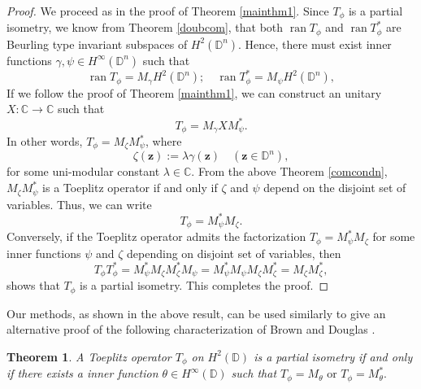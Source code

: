 \documentclass[12pt]{amsart}
\newtheorem{thm}[propn]{Theorem}
\theoremstyle{definition}
\newcommand{\D}{\mathbb{D}}
\DeclareMathOperator{\ran}{ran}
\newcommand{\1}{{\mbox{\bf 1}}}
\newcommand{\raro}{\rightarrow}
\begin{document}
\begin{proof}
We proceed as in the proof of Theorem \ref{mainthm1}. Since $T_{\phi}$ is a partial isometry, we know from Theorem \ref{doubcom}, that both $\ran T_{\phi}$ and $\ran T_{\phi}^*$ are Beurling type invariant subspaces of $H^2(\D^n)$. Hence, there must exist inner functions $\gamma, \psi \in H^{\infty}(\D^n)$ such that 
\[
\ran T_{\phi} =M_{\gamma} H^2(\D^n); \quad \ran T_{\phi}^* = M_{\psi} H^2(\D^n),
\]
If we follow the proof of Theorem \ref{mainthm1}, we can construct an unitary $X: \mathbb{C} \raro \mathbb{C}$ such that 
\[
T_{\phi} = M_{\gamma} X M_{\psi}^*.
\]
In other words, $T_{\phi} = M_{\zeta} M_{\psi}^*$, where 
\[
\zeta(\bm{z}):= \lambda \gamma(\bm{z}) \quad (\bm{z} \in \D^n),
\]
for some uni-modular constant $\lambda \in \mathbb{C}$.  From the above Theorem \ref{comcondn}, $M_{\zeta} M_{\psi}^*$ is a Toeplitz operator if and only if $\zeta$ and $\psi$ depend on the disjoint set of variables. Thus, we can write
\[
T_{\phi} = M_{\psi}^* M_{\zeta}.
\]
Conversely, if the Toeplitz operator admits the factorization $T_{\phi} = M_{\psi}^* M_{\zeta}$ for some inner functions $\psi$ and $\zeta$ depending on disjoint set of variables, then
\[
T_{\phi}T_{\phi}^* = M_{\psi}^* M_{\zeta} M_{\zeta}^* M_{\psi} = M_{\psi}^* M_{\psi}  M_{\zeta} M_{\zeta}^* = M_{\zeta} M_{\zeta}^*,
\]
shows that $T_{\phi}$ is a partial isometry. This completes the proof.
\end{proof}
Our methods, as shown in the above result, can be used similarly to give an alternative proof of the following characterization of Brown and Douglas \cite{BD}.
\begin{thm}
A Toeplitz operator $T_{\phi}$ on $H^2(\D)$ is a partial isometry if and only if there exists a inner function $\theta \in H^{\infty}(\D)$ such that $T_{\phi} = M_{\theta}  \text{ or } T_{\phi} = M_{\theta}^*.$
\end{thm}
\end{document}
